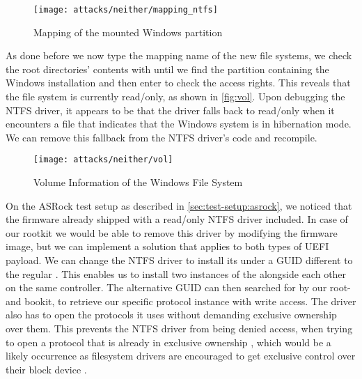 \begin{figure}[htb]
    \centering
    \texttt{[image: attacks/neither/mapping\_ntfs]}
    \caption{Mapping of the mounted Windows partition}
    \label{fig:mapping-ntfs}
\end{figure}

As done before we now type the mapping name of the new file systems, we check the root directories' contents with  until we find the partition containing the Windows installation and then enter  to check the access rights.
This reveals that the file system is currently read\-/only, as shown in \autoref{fig:vol}.
Upon debugging the \ac{NTFS} driver, it appears to be that the driver falls back to read\-/only when it encounters a file that indicates that the Windows system is in hibernation mode.
We can remove this fallback from the \ac{NTFS} driver's code and recompile.

\begin{figure}[htb]
    \centering
    \texttt{[image: attacks/neither/vol]}
    \caption{Volume Information of the Windows File System}
    \label{fig:vol}
\end{figure}

On the ASRock test setup as described in \autoref{sec:test-setup:asrock}, we noticed that the firmware already shipped with a read\-/only \ac{NTFS} driver included.
In case of our rootkit we would be able to remove this driver by modifying the firmware image, but we can implement a solution that applies to both types of \ac{UEFI} payload.
We can change the \ac{NTFS} driver to install its  under a \ac{GUID} different to the regular .
This enables us to install two instances of the  alongside each other on the same controller.
The alternative \ac{GUID} can then searched for by our root- and bookit, to retrieve our specific protocol instance with write access.
The driver also has to open the protocols it uses without demanding exclusive ownership over them.
This prevents the \ac{NTFS} driver from being denied access, when trying to open a protocol that is already in exclusive ownership \cite[Section 7.3]{uefi-spec}, which would be a likely occurrence as filesystem drivers are encouraged to get exclusive control over their block device \cite[Section 13.5]{uefi-spec}.

